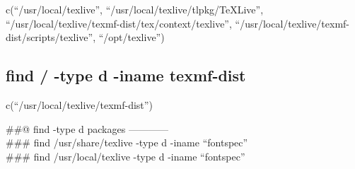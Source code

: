 \documentclass[
]{article}
\newenvironment{Shaded}{\begin{snugshade}}{\end{snugshade}}
\newcommand{\AttributeTok}[1]{\textcolor[rgb]{0.13,0.29,0.53}{#1}}
\newcommand{\ConstantTok}[1]{\textcolor[rgb]{0.56,0.35,0.01}{#1}}
\newcommand{\ControlFlowTok}[1]{\textcolor[rgb]{0.13,0.29,0.53}{\textbf{#1}}}
\newcommand{\DecValTok}[1]{\textcolor[rgb]{0.00,0.00,0.81}{#1}}
\newcommand{\FunctionTok}[1]{\textcolor[rgb]{0.13,0.29,0.53}{\textbf{#1}}}
\newcommand{\NormalTok}[1]{#1}
\newcommand{\SpecialCharTok}[1]{\textcolor[rgb]{0.81,0.36,0.00}{\textbf{#1}}}
\newcommand{\StringTok}[1]{\textcolor[rgb]{0.31,0.60,0.02}{#1}}
\begin{document}
c(``/usr/local/texlive'', ``/usr/local/texlive/tlpkg/TeXLive'',
``/usr/local/texlive/texmf-dist/tex/context/texlive'',
``/usr/local/texlive/texmf-dist/scripts/texlive'', ``/opt/texlive'')

\hypertarget{find--type-d--iname-texmf-dist}{%
\subsection{find / -type d -iname
texmf-dist}\label{find--type-d--iname-texmf-dist}}

\begin{Shaded}
\end{Shaded}

c(``/usr/local/texlive/texmf-dist'')

\#\#@ find -type d packages ------------\\
\#\#\# find /usr/share/texlive -type d -iname ``fontspec''\\
\#\#\# find /usr/local/texlive -type d -iname ``fontspec''
\end{document}
